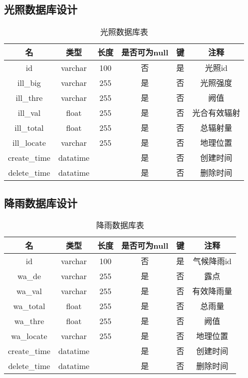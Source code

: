 \subsection{光照数据库设计}
\begin{table}[H]
	\centering
	\caption[光照数据]{光照数据库表}
	\begin{tabular}{cccccc}
		\toprule
		名            & 类型      & 长度 &是否可为null & 键 & 注释\\
		\midrule
		id            & varchar  & 100  & 否 & 是 & 光照id \\
		ill\_big     & varchar  & 255  &是  & 否 & 光照强度   \\
		ill\_thre      & varchar  & 255  &是  & 否 & 阙值   \\
		ill\_val   & float    & 255  &是  & 否 & 光合有效辐射 \\
		ill\_total     & float    & 255  &是  & 否 & 总辐射量   \\
		ill\_locate       & varchar    & 255  & 是 & 否 & 地理位置     \\
		create\_time  & datatime &      &是  & 否 & 创建时间   \\
		delete\_time  &datatime  &      & 是 & 否 & 删除时间   \\ 
		\bottomrule
	\end{tabular}
\end{table}

\subsection{降雨数据库设计}
\begin{table}[H]
	\centering
	\caption[降雨数据]{降雨数据库表}
	\begin{tabular}{cccccc}
		\toprule
		名            & 类型      & 长度 &是否可为null & 键 & 注释\\
		\midrule
		id            & varchar  & 100  & 否 & 是 & 气候降雨id \\
		wa\_de     & varchar  & 255  &是  & 否 & 露点   \\
		wa\_val      & varchar  & 255  &是  & 否 & 有效降雨量   \\
		wa\_total   & float    & 255  &是  & 否 & 总雨量 \\
	    wa\_thre     & float    & 255  &是  & 否 & 阙值   \\
		wa\_locate   & varchar    & 255  & 是 & 否 & 地理位置     \\
		create\_time  & datatime &      &是  & 否 & 创建时间   \\
		delete\_time  &datatime  &      & 是 & 否 & 删除时间   \\ 
		\bottomrule
	\end{tabular}
\end{table}


